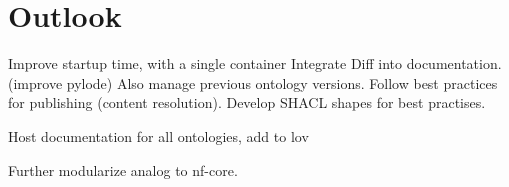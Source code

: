 \documentclass[sigconf]{acmart}
\begin{document}

\section{Outlook}

Improve startup time, with a single container
Integrate Diff into documentation. (improve pylode)
Also manage previous ontology versions.
Follow best practices for publishing (content resolution).
Develop SHACL shapes for best practises.

Host documentation for all ontologies, add to lov

Further modularize analog to nf-core.



\end{document}

